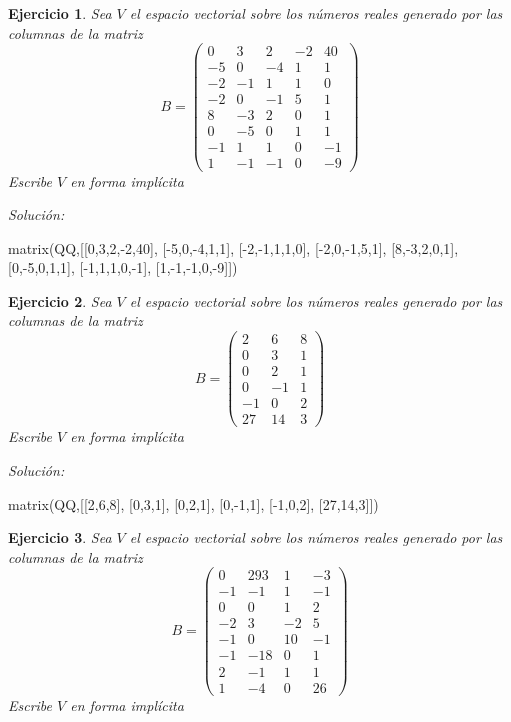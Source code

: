 \documentclass{amsart}
\newtheorem{ejer}{Ejercicio}
\begin{document}


\begin{ejer} Sea $V$ el espacio vectorial sobre los números reales 
generado por las columnas de la matriz 
\[B = \left(\begin{array}{rrrrr}
0 & 3 & 2 & -2 & 40 \\
-5 & 0 & -4 & 1 & 1 \\
-2 & -1 & 1 & 1 & 0 \\
-2 & 0 & -1 & 5 & 1 \\
8 & -3 & 2 & 0 & 1 \\
0 & -5 & 0 & 1 & 1 \\
-1 & 1 & 1 & 0 & -1 \\
1 & -1 & -1 & 0 & -9
\end{array}\right)\]
Escribe $V$ en forma impl\'icita 
\end{ejer}

{\it Soluci\'on:}

\begin{sageblock}
matrix(QQ,[[0,3,2,-2,40],
[-5,0,-4,1,1],
[-2,-1,1,1,0],
[-2,0,-1,5,1],
[8,-3,2,0,1],
[0,-5,0,1,1],
[-1,1,1,0,-1],
[1,-1,-1,0,-9]])
\end{sageblock}



\begin{ejer} Sea $V$ el espacio vectorial sobre los números reales 
generado por las columnas de la matriz 
\[B = \left(\begin{array}{rrr}
2 & 6 & 8 \\
0 & 3 & 1 \\
0 & 2 & 1 \\
0 & -1 & 1 \\
-1 & 0 & 2 \\
27 & 14 & 3
\end{array}\right)\]
Escribe $V$ en forma impl\'icita 
\end{ejer}

{\it Soluci\'on:}

\begin{sageblock}
matrix(QQ,[[2,6,8],
[0,3,1],
[0,2,1],
[0,-1,1],
[-1,0,2],
[27,14,3]])
\end{sageblock}



\begin{ejer} Sea $V$ el espacio vectorial sobre los números reales 
generado por las columnas de la matriz 
\[B = \left(\begin{array}{rrrr}
0 & 293 & 1 & -3 \\
-1 & -1 & 1 & -1 \\
0 & 0 & 1 & 2 \\
-2 & 3 & -2 & 5 \\
-1 & 0 & 10 & -1 \\
-1 & -18 & 0 & 1 \\
2 & -1 & 1 & 1 \\
1 & -4 & 0 & 26
\end{array}\right)\]
Escribe $V$ en forma impl\'icita 
\end{ejer}
\end{document}
